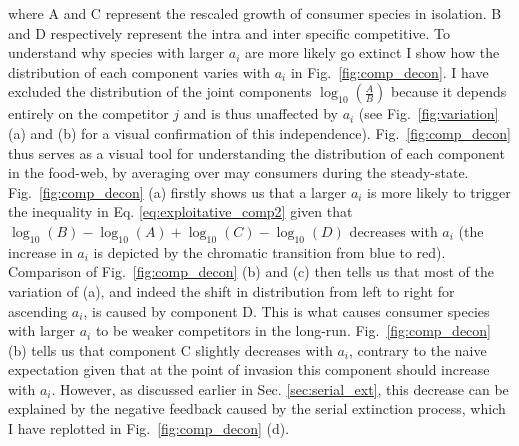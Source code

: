\documentclass[a4paper]{report}
\DeclareMathOperator{\log}{log}
\begin{document}
{where A and C represent the rescaled growth of consumer species in isolation. B and D respectively represent the intra and inter specific competitive. To understand why species with larger $a_i$ are more likely go extinct I  show how the distribution of each component varies with $a_i$ in Fig.~\ref{fig:comp_decon}. I have excluded the distribution of the joint components $\log_{10}(\frac{A}{B})$ because it depends entirely on the competitor $j$ and is thus unaffected by $a_i$ (see Fig.~\ref{fig:variation} (a) and (b) for a visual confirmation of this independence). Fig.~\ref{fig:comp_decon} thus serves as a visual tool for understanding the distribution of each component in the food-web, by averaging over may consumers during the steady-state. Fig.~\ref{fig:comp_decon} (a) firstly shows us that a larger $a_i$ is more likely to trigger the inequality in Eq. \eqref{eq:exploitative_comp2} given that $\log_{10}(B)-\log_{10}(A)+\log_{10}(C)-\log_{10}(D)$ decreases with $a_i$ (the increase in $a_i$ is depicted by the chromatic transition from blue to red). Comparison of Fig.~\ref{fig:comp_decon} (b) and (c) then tells us that most of the variation of (a), and indeed the shift in distribution from left to right for ascending $a_i$, is caused by component D. This is  what causes consumer species with larger $a_i$ to be weaker competitors in the long-run. Fig.~\ref{fig:comp_decon} (b) tells us that component C slightly decreases with $a_i$, contrary to the naive expectation given that at the point of invasion this component should increase with $a_i$. However, as discussed earlier in Sec. \ref{sec:serial_ext}, this decrease can be explained by the negative feedback caused by the serial extinction process, which I have replotted in Fig.~\ref{fig:comp_decon} (d). \\

\begin{figure}[H]
 


\end{figure}}
\end{document}
